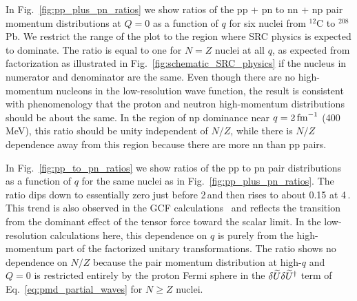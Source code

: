 \documentclass[10pt,aps,prc,floatfix,twocolumn,nofootinbib]{revtex4-1}
\begin{document}
In Fig.~\ref{fig:pp_plus_pn_ratios} we show ratios of the pp + pn to nn + np pair momentum distributions at $Q=0$ as a function of $q$ for six nuclei from $^{12}$C to $^{208}$Pb.
We restrict the range of the plot to the region where SRC physics is expected to dominate.
The ratio is equal to one for $N=Z$ nuclei at all $q$, as expected from factorization as illustrated in Fig.~\ref{fig:schematic_SRC_physics} if the nucleus in numerator and denominator are the same.
Even though there are no high-momentum nucleons in the low-resolution wave function, the result is consistent with phenomenology that the proton and neutron high-momentum distributions should be about the same.
In the region of np dominance near $q=2\,\mbox{fm}^{-1}$ (400\,MeV), this ratio should be unity independent of $N/Z$, while there is $N/Z$ dependence away from this region because there are more nn than pp pairs.


In Fig.~\ref{fig:pp_to_pn_ratios} we show ratios of the pp to pn pair distributions as a function of $q$ for the same nuclei as in Fig.~\ref{fig:pp_plus_pn_ratios}.
The ratio dips down to essentially zero just before 2\,\fmi and then rises to about 0.15 at 4\,\fmi.
This trend is also observed in the GCF calculations~\cite{Cruz-Torres:2019fum,Korover:2020lqf} and reflects the transition from the dominant effect of the tensor force toward the scalar limit.
In the low-resolution calculations here, this dependence on $q$ is purely from the high-momentum part of the factorized unitary transformations.
The ratio shows no dependence on $N/Z$ because the pair momentum distribution at high-$q$ and $Q=0$ is restricted entirely by the proton Fermi sphere in the $\delta \widetilde U\delta \widetilde U^{\dagger}$ term of Eq.~\eqref{eq:pmd_partial_waves} for $N \ge Z$ nuclei.
\end{document}
